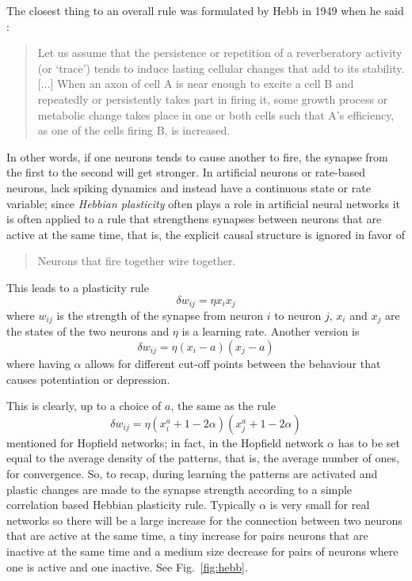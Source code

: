 \documentclass[12pt]{article}
\begin{document}
The closest thing to an overall rule was formulated by Hebb in 1949
when he said \cite{Hebb1949a}:
\begin{quote}
Let us assume that the persistence or repetition of a reverberatory
activity (or \lq{}trace\rq{}) tends to induce lasting cellular changes that
add to its stability. [$\ldots$] When an axon of cell A is near enough to excite
a cell B and repeatedly or persistently takes part in firing it, some
growth process or metabolic change takes place in one or both cells
such that A's efficiency, as one of the cells firing B, is increased.
\end{quote}
In other words, if one neurons tends to cause another to fire, the
synapse from the first to the second will get stronger. In artificial
neurons or rate-based neurons, lack spiking dynamics and instead have
a continuous state or rate variable; since \textsl{Hebbian plasticity}
often plays a role in artificial neural networks it is often applied
to a rule that strengthens synapses between neurons that are active at
the same time, that is, the explicit causal structure is ignored in
favor of
\begin{quote}
Neurons that fire together wire together.
\end{quote}
This leads to a plasticity rule 
\begin{equation}
\delta w_{ij}=\eta x_i x_j
\end{equation}
where $w_{ij}$ is the strength of the synapse from neuron $i$ to
neuron $j$, $x_i$ and $x_j$ are the states of the two neurons and
$\eta$ is a learning rate. Another version is
\begin{equation}
\delta w_{ij}=\eta (x_i-a)(x_j-a)
\end{equation}
where having $\alpha$ allows for different cut-off points between the behaviour that causes potentiation or depression. 


This is clearly, up to a choice of $a$, the same as the rule 
\begin{equation}
\delta w_{ij}=\eta (x_i^a+1-2\alpha)(x_j^a+1-2\alpha)
\end{equation}
mentioned for Hopfield networks; in fact, in the Hopfield network
$\alpha$ has to be set equal to the average density of the patterns,
that is, the average number of ones, for convergence. So, to recap,
during learning the patterns are activated and plastic changes are
made to the synapse strength according to a simple correlation based
Hebbian plasticity rule.
Typically $\alpha$ is very small for real networks so there will be a large
increase for the connection between two neurons that are active at the
same time, a tiny increase for pairs neurons that are inactive at the
same time and a medium size decrease for pairs of neurons where one is
active and one inactive. See Fig.~\ref{fig:hebb}.
\end{document}
